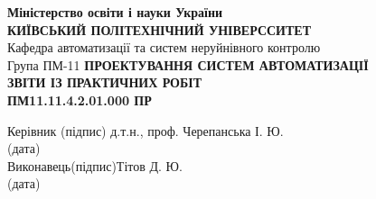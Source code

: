 \documentclass[a4paper]{article}
\begin{document}
\thispagestyle{empty}
\centering
\textbf{Міністерство освіти і науки України}\\
\textbf{КИЇВСЬКИЙ ПОЛІТЕХНІЧНИЙ УНІВЕРССИТЕТ}\\[2cm]
\raggedleft
Кафедра автоматизації та систем неруйнівного контролю\\
Група ПМ-11
\vfill
\centering
\textbf{ПРОЕКТУВАННЯ СИСТЕМ АВТОМАТИЗАЦІЇ}\\[1cm]
\textbf{ЗВІТИ ІЗ ПРАКТИЧНИХ РОБІТ}\\[1cm]
\textbf{ПМ11.11.4.2.01.000 ПР}
\vfill
\begin{flushleft}
    Керівник  \qquad\qquad\quad \hfill\qquad (підпис)\hfill 
    д.т.н., проф. Черепанська І. Ю.\\
    \hfill (дата)\\[2cm]
    Виконавець\hfill (підпис)\hfill Тітов Д. Ю.\\
    \hfill (дата)
\end{flushleft}
\vfill
{}
\newpage


\thispagestyle{empty} %
    
    
\end{document}
